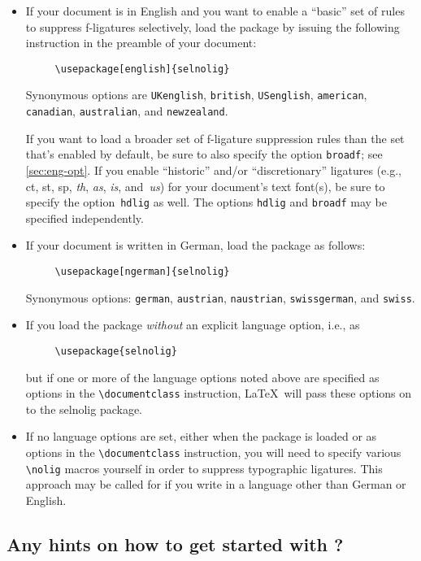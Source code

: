 \documentclass[11pt]{article}
\newcommand{\pkg}[1]{\textsf{#1}}
\newcommand{\opt}[1]{\texttt{#1}}
\newcommand{\cmmd}[1]{\texttt{\textbackslash #1}}
\begin{document}
\begin{itemize}
\item If your document is in English and you want to enable a \enquote{basic} set of rules to suppress f-ligatures selectively, load the package by issuing the following instruction in the preamble of your document:
\begin{Verbatim}
     \usepackage[english]{selnolig}
\end{Verbatim}
Synonymous options are \opt{UKenglish}, \opt{british}, \opt{USenglish}, \opt{american}, \opt{cana\-dian}, \opt{australian}, and \opt{new\-zea\-land}.

If you want to load a broader set of f-ligature suppression rules than the set that's enabled by default, be sure to also specify the option \opt{broadf}; see \cref{sec:eng-opt}.
If you enable \enquote{historic} and/or \enquote{discretionary} ligatures (e.g., ct, st, sp, \emph{th}, \emph{as}, \emph{is}, and~\emph{us}) for your document's text font(s), be sure to specify the option~\opt{hdlig} as well. The options \opt{hdlig} and \opt{broadf} may be specified independently.

\item If your document is written in German, load the package as follows:
\begin{Verbatim}
     \usepackage[ngerman]{selnolig}
\end{Verbatim}
Synonymous options: \opt{german}, \opt{austrian}, \opt{naustrian}, \opt{swissgerman}, and \opt{swiss}.

\item If you load the package \emph{without} an explicit language option, i.e., as
\begin{Verbatim}
     \usepackage{selnolig}
\end{Verbatim}
but if one or more of the language options noted above are specified as options in the \cmmd{documentclass} instruction, \LaTeX\ will pass these options on to the \pkg{selnolig} package.

\item If no language options are set, either when the package is loaded or as options in the \cmmd{documentclass} instruction, you will need to specify various \cmmd{nolig} macros yourself in order to suppress typographic ligatures. This approach may be called for if you write in a language other than German or English.

\end{itemize}


\subsection{Any hints on how to get started with \LuaLaTeX?}
\end{document}
